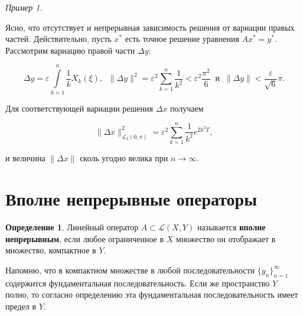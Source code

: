 \documentclass[12pt,a4paper,titlepage,oneside]{book}
\theoremstyle{definition}
\newtheorem*{definition}{Определение}
\theoremstyle{plain}
\theoremstyle{remark}
\theoremstyle{remark}
\newtheorem*{example}{Пример}
\theoremstyle{remark}
\theoremstyle{remark}
\theoremstyle{plain}
\theoremstyle{plain}
\begin{document}
\begin{example}
\begin{enumerate}
Ясно, что отсутствует и непрерывная зависимость решения от вариации правых частей. Действительно, пусть $x^{*}$ есть точное решение уравнения $Ax^*=y^*$. Рассмотрим вариацию правой части  $\Delta y$:
\begin{center}
$$\Delta y = \varepsilon \int\limits_{k=1}^{n} \frac{1}{k} X_k(\xi) , \; \; \| \Delta y\|^2 = \varepsilon ^2 \sum\limits_{k=1}^{n} \frac{1}{k^2} < \varepsilon^2 \frac{\pi ^2}{6} \; \; \mbox{и} \; \; \| \Delta y \| < \frac{\varepsilon}{\sqrt{6}}\pi.$$
\end{center}

Для соответствующей вариации решения $\Delta x$ получаем
\begin{center}
$$\| \Delta x \|_{\mathcal{L}_2(0, \pi)}^2 = \varepsilon ^2 \sum\limits_{k=1}^n \frac{1}{k^2} e^{2 k^2 T},$$
\end{center}
и величина $\| \Delta x \|$ сколь угодно велика при $n \longrightarrow \infty.$

\end{enumerate}

\end{example}

\section{Вполне непрерывные операторы}
\begin{definition}Линейный оператор $A \subset \mathcal{L}(X, Y)$ называется \textbf{вполне непрерывным}, если любое ограниченное в $X$ множество он отображает в множество, компактное в $Y$.
\end{definition}
Напомню, что в компактном множестве в любой последовательности $\lbrace y_n \rbrace_{n=1}^{\infty}$ содержится фундаментальная последовательность. Если же пространство $Y$ полно, то согласно определению эта фундаментальная последовательность имеет предел в $Y$.
\end{document}
